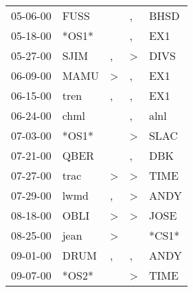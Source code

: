 \begin{supertabular}{p{0.07\textwidth}p{0.06\textwidth}p{0.02\textwidth}p{0.02\textwidth}p{0.06\textwidth}}
          05-06-00\textsuperscript{} &           FUSS\textsuperscript{} &                  &                , &           BHSD\textsuperscript{} \\
          05-18-00\textsuperscript{} &                            *OS1* &                  &                , &            EX1\textsuperscript{} \\
          05-27-00\textsuperscript{} &           SJIM\textsuperscript{} &                , &     \textgreater &           DIVS\textsuperscript{} \\
          06-09-00\textsuperscript{} &           MAMU\textsuperscript{} &     \textgreater &                , &            EX1\textsuperscript{} \\
          06-15-00\textsuperscript{} &           tren\textsuperscript{} &                , &                , &            EX1\textsuperscript{} \\
          06-24-00\textsuperscript{} &           chml\textsuperscript{} &                  &                , &           alnl\textsuperscript{} \\
          07-03-00\textsuperscript{} &                            *OS1* &                  &     \textgreater &           SLAC\textsuperscript{} \\
          07-21-00\textsuperscript{} &           QBER\textsuperscript{} &                  &                , &            DBK\textsuperscript{} \\
          07-27-00\textsuperscript{} &           trac\textsuperscript{} &     \textgreater &     \textgreater &           TIME\textsuperscript{} \\
          07-29-00\textsuperscript{} &           lwmd\textsuperscript{} &                , &     \textgreater &           ANDY\textsuperscript{} \\
          08-18-00\textsuperscript{} &           OBLI\textsuperscript{} &     \textgreater &     \textgreater &           JOSE\textsuperscript{} \\
          08-25-00\textsuperscript{} &           jean\textsuperscript{} &     \textgreater &                  &                            *CS1* \\
          09-01-00\textsuperscript{} &           DRUM\textsuperscript{} &                , &                , &           ANDY\textsuperscript{} \\
          09-07-00\textsuperscript{} &                            *OS2* &                  &     \textgreater &           TIME\textsuperscript{} \\

\end{supertabular}
